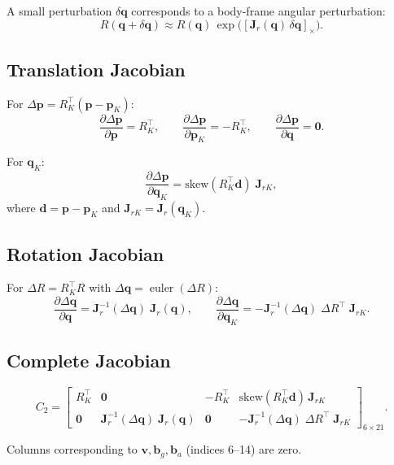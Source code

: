\documentclass[11pt,a4paper]{article}
\begin{document}
A small perturbation \(\delta\mathbf{q}\) corresponds to a body-frame angular perturbation:
\[
R(\mathbf{q}+\delta\mathbf{q}) \approx R(\mathbf{q})\,\exp\!\big([\mathbf{J}_r(\mathbf{q})\,\delta\mathbf{q}]_\times\big).
\]

\subsection{Translation Jacobian}

For \(\Delta\mathbf{p} = R_K^\top(\mathbf{p} - \mathbf{p}_K)\):
\[
\frac{\partial\Delta\mathbf{p}}{\partial\mathbf{p}} = R_K^\top,\qquad
\frac{\partial\Delta\mathbf{p}}{\partial\mathbf{p}_K} = -R_K^\top,\qquad
\frac{\partial\Delta\mathbf{p}}{\partial\mathbf{q}} = \mathbf{0}.
\]

For \(\mathbf{q}_K\):
\[
\frac{\partial\Delta\mathbf{p}}{\partial\mathbf{q}_K} = \mathrm{skew}(R_K^\top\mathbf{d})\;\mathbf{J}_{rK},
\]
where \(\mathbf{d} = \mathbf{p} - \mathbf{p}_K\) and \(\mathbf{J}_{rK} = \mathbf{J}_r(\mathbf{q}_K)\).

\subsection{Rotation Jacobian}

For \(\Delta R = R_K^\top R\) with \(\Delta\mathbf{q} = \operatorname{euler}(\Delta R)\):
\[
\frac{\partial\Delta\mathbf{q}}{\partial\mathbf{q}} = \mathbf{J}_r^{-1}(\Delta\mathbf{q})\;\mathbf{J}_r(\mathbf{q}),\qquad
\frac{\partial\Delta\mathbf{q}}{\partial\mathbf{q}_K} = -\mathbf{J}_r^{-1}(\Delta\mathbf{q})\;\Delta R^\top\;\mathbf{J}_{rK}.
\]

\subsection{Complete Jacobian}

\[
C_2 = \begin{bmatrix}
R_K^\top & \mathbf{0} & -R_K^\top & \mathrm{skew}(R_K^\top\mathbf{d})\,\mathbf{J}_{rK} \\[4pt]
\mathbf{0} & \mathbf{J}_r^{-1}(\Delta\mathbf{q})\;\mathbf{J}_r(\mathbf{q}) & \mathbf{0} & -\mathbf{J}_r^{-1}(\Delta\mathbf{q})\;\Delta R^\top\;\mathbf{J}_{rK}
\end{bmatrix}_{6\times21}.
\]

Columns corresponding to \(\mathbf{v}, \mathbf{b}_g, \mathbf{b}_a\) (indices 6--14) are zero.

\end{document}
